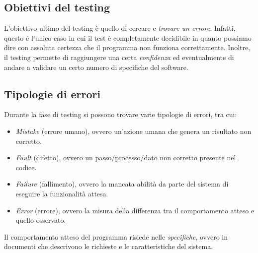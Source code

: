 \documentclass[a4paper,oneside,titlepage]{book}
\begin{document}
\subsection{Obiettivi del testing}
L'obiettivo ultimo del testing è quello di cercare e \textit{trovare un errore}. Infatti, questo è l'unico caso in cui il test è completamente decidibile in quanto possiamo dire con assoluta certezza che il programma non funziona correttamente. Inoltre, il testing permette di raggiungere una certa \textit{confidenza} ed eventualmente di andare a validare un certo numero di specifiche del software.

\subsection{Tipologie di errori}
Durante la fase di testing si possono trovare varie tipologie di errori, tra cui:
\begin{itemize}
    \item \textit{Mistake} (errore umano), ovvero un'azione umana che genera un risultato non corretto.
    \item \textit{Fault} (difetto), ovvero un passo/processo/dato non corretto presente nel codice.
    \item \textit{Failure} (fallimento), ovvero la mancata abilità da parte del sistema di eseguire la funzionalità attesa.
    \item \textit{Error} (errore), ovvero la misura della differenza tra il comportamento atteso e quello osservato.
\end{itemize}
Il comportamento atteso del programma risiede nelle \textit{specifiche}, ovvero in documenti che descrivono le richieste e le caratteristiche del sistema.
\end{document}
